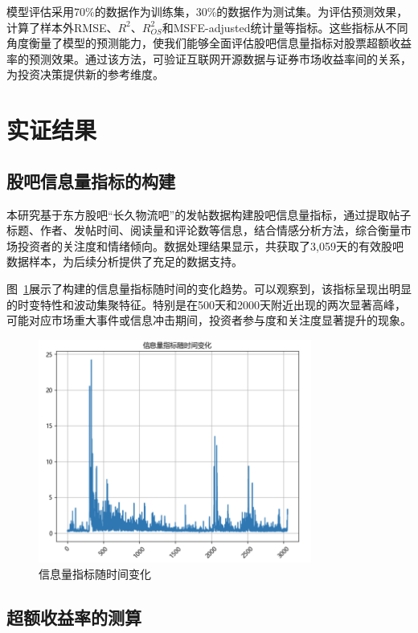 \documentclass[12pt, a4paper]{article}
\begin{document}
模型评估采用70\%的数据作为训练集，30\%的数据作为测试集。为评估预测效果，计算了样本外RMSE、$R^2$、$R^2_{OS}$和MSFE-adjusted统计量等指标。这些指标从不同角度衡量了模型的预测能力，使我们能够全面评估股吧信息量指标对股票超额收益率的预测效果。通过该方法，可验证互联网开源数据与证券市场收益率间的关系，为投资决策提供新的参考维度。

\section{实证结果}

\subsection{股吧信息量指标的构建}

本研究基于东方股吧“长久物流吧”的发帖数据构建股吧信息量指标，通过提取帖子标题、作者、发帖时间、阅读量和评论数等信息，结合情感分析方法，综合衡量市场投资者的关注度和情绪倾向。数据处理结果显示，共获取了3,059天的有效股吧数据样本，为后续分析提供了充足的数据支持。

图~\ref{fig:info_index_time}展示了构建的信息量指标随时间的变化趋势。可以观察到，该指标呈现出明显的时变特性和波动集聚特征。特别是在500天和2000天附近出现的两次显著高峰，可能对应市场重大事件或信息冲击期间，投资者参与度和关注度显著提升的现象。

\begin{figure}[htbp]
\centering
\includegraphics[width=0.8\textwidth]{fig/info_index_time.png}
\caption{信息量指标随时间变化}
\label{fig:info_index_time}
\end{figure}

\subsection{超额收益率的测算}
\end{document}
